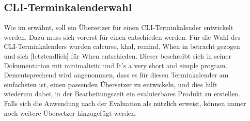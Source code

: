 \subsection{CLI-Terminkalenderwahl}\label{section:tech:sub:cli_terminkalender}%
Wie im  erwähnt, soll ein Übersetzer für einen CLI-Terminkalender entwickelt werden. Dazu muss sich vorerst für einen entschieden werden.\newline%
Für die Wahl des CLI-Terminkalenders wurden calcurse\cite{cli_calcurse}, khal\cite{cli_khal}, remind\cite{cli_remind}, When\cite{cli_when} in betracht gezogen und sich [letztendlich] für When entschieden. Dieser beschreibt sich in seiner Dokumentation mit \glqq minimalistic\grqq{} und \glqq It's a very short and simple program\grqq{}\cite{cli_when}. Dementsprechend wird angenommen, dass es für diesen Terminkalender am einfachsten ist, einen passenden Übersetzer zu entwickeln, und dies hilft wiederum dabei, in der Bearbeitungszeit ein evaluierbares Produkt zu erstellen.\newline%
%
Falls sich die Anwendung nach der Evaluation als nützlich erweist, können immer noch weitere Übersetzer hinzugefügt werden.%